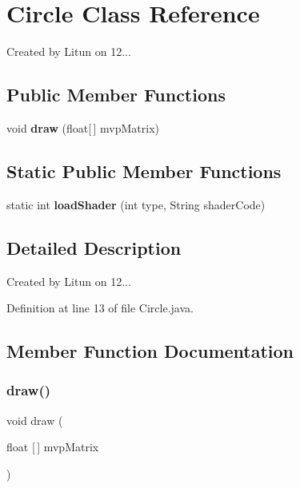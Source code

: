 \section{Circle Class Reference}
\label{classsf_1_1unitingtwist_1_1_circle}


Created by Litun on 12...  


\subsection*{Public Member Functions}
\begin{DoxyCompactItemize}
\item 
void \textbf{ draw} (float[$\,$] mvp\+Matrix)
\end{DoxyCompactItemize}
\subsection*{Static Public Member Functions}
\begin{DoxyCompactItemize}
\item 
static int \textbf{ load\+Shader} (int type, String shader\+Code)
\end{DoxyCompactItemize}


\subsection{Detailed Description}
Created by Litun on 12... 

Definition at line 13 of file Circle.\+java.



\subsection{Member Function Documentation}
\mbox{\label{classsf_1_1unitingtwist_1_1_circle_ace8a0d2a4e41b6d83897d48fd91a7ab3}} 
\subsubsection{draw()}
{\footnotesize\ttfamily void draw (\begin{DoxyParamCaption}\item[{float [$\,$]}]{mvp\+Matrix }\end{DoxyParamCaption})}



